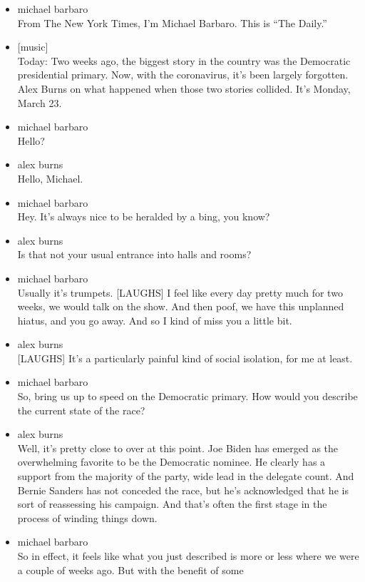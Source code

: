 \begin{itemize}
\item
  michael barbaro\\
  From The New York Times, I'm Michael Barbaro. This is ``The Daily.''
\item
  {[}music{]}\\
  Today: Two weeks ago, the biggest story in the country was the
  Democratic presidential primary. Now, with the coronavirus, it's been
  largely forgotten. Alex Burns on what happened when those two stories
  collided. It's Monday, March 23.
\item
  michael barbaro\\
  Hello?
\item
  alex burns\\
  Hello, Michael.
\item
  michael barbaro\\
  Hey. It's always nice to be heralded by a bing, you know?
\item
  alex burns\\
  Is that not your usual entrance into halls and rooms?
\item
  michael barbaro\\
  Usually it's trumpets. {[}LAUGHS{]} I feel like every day pretty much
  for two weeks, we would talk on the show. And then poof, we have this
  unplanned hiatus, and you go away. And so I kind of miss you a little
  bit.
\item
  alex burns\\
  {[}LAUGHS{]} It's a particularly painful kind of social isolation, for
  me at least.
\item
  michael barbaro\\
  So, bring us up to speed on the Democratic primary. How would you
  describe the current state of the race?
\item
  alex burns\\
  Well, it's pretty close to over at this point. Joe Biden has emerged
  as the overwhelming favorite to be the Democratic nominee. He clearly
  has a support from the majority of the party, wide lead in the
  delegate count. And Bernie Sanders has not conceded the race, but he's
  acknowledged that he is sort of reassessing his campaign. And that's
  often the first stage in the process of winding things down.
\item
  michael barbaro\\
  So in effect, it feels like what you just described is more or less
  where we were a couple of weeks ago. But with the benefit of some

\end{itemize}
